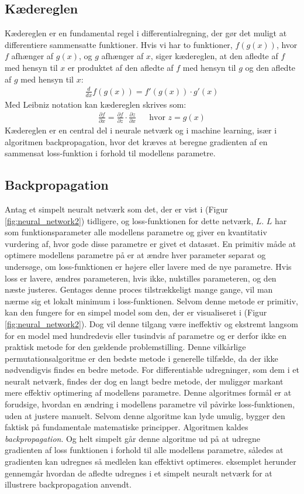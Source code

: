 \documentclass{article}
\newcommand{\figureref}[1]{(Figur \ref{#1})}
\begin{document}
\subsection{Kædereglen}
Kædereglen er en fundamental regel i differentialregning, der gør det muligt at differentiere sammensatte funktioner. Hvis vi har to funktioner, $f(g(x))$, hvor $f$ afhænger af $g(x)$, og $g$ afhænger af $x$, siger kædereglen, at den afledte af $f$ med hensyn til $x$ er produktet af den afledte af $f$ med hensyn til $g$ og den afledte af $g$ med hensyn til $x$:
\begin{align}
  \frac{d}{dx} f(g(x)) = f'(g(x)) \cdot g'(x)
\end{align}
Med Leibniz notation kan kædereglen skrives som:
\begin{align}
  \frac{\partial f}{\partial x} = \frac{\partial f}{\partial z} \cdot \frac{\partial z}{\partial x}
  &&
  \text{hvor } z = g(x)
\end{align}
Kædereglen er en central del i neurale netværk og i machine learning, især i algoritmen backpropagation, hvor det kræves at beregne gradienten af en sammensat loss-funktion i forhold til modellens parametre. \parencite{Kirsanov_2024}
\subsection{Backpropagation}
Antag et simpelt neuralt netværk som det, der er vist i \figureref{fig:neural_network2} tidligere, og loss-funktionen for dette netværk, $L$. $L$ har som funktionsparameter alle modellens parametre og giver en kvantitativ vurdering af, hvor gode disse parametre er givet et datasæt. En primitiv måde at optimere modellens parametre på er at ændre hver parameter separat og undersøge, om loss-funktionen er højere eller lavere med de nye parametre. Hvis loss er lavere, ændres parameteren, hvis ikke, nulstilles parameteren, og den næste justeres. Gentages denne proces tilstrækkeligt mange gange, vil man nærme sig et lokalt minimum i loss-funktionen. Selvom denne metode er primitiv, kan den fungere for en simpel model som den, der er visualiseret i \figureref{fig:neural_network2}. Dog vil denne tilgang være ineffektiv og ekstremt langsom for en model med hundredevis eller tusindvis af parametre og er derfor ikke en praktisk metode for den gældende problemstilling. Denne vilkårlige permutationsalgoritme er den bedste metode i generelle tilfælde, da der ikke nødvendigvis findes en bedre metode. \parencite{Kirsanov_2024} For differentiable udregninger, som dem i et neuralt netværk, findes der dog en langt bedre metode, der muliggør markant mere effektiv optimering af modellens parametre. Denne algoritmes formål er at forudsige, hvordan en ændring i modellens parametre vil påvirke loss-funktionen, uden at justere manuelt. Selvom denne algoritme kan lyde umulig, bygger den faktisk på fundamentale matematiske principper. Algoritmen kaldes \textit{backpropagation}. Og helt simpelt går denne algoritme ud på at udregne gradienten af loss funktionen i forhold til alle modellens parametre, således at gradienten kan udregnes så medlelen kan effektivt optimeres. \parencite{Kirsanov_2024, Nielsen_2019b, Sanderson_2017} eksemplet herunder gennemgår hvordan de afledte udregnes i et simpelt neuralt netværk for at illustrere backpropagation anvendt.
\end{document}
